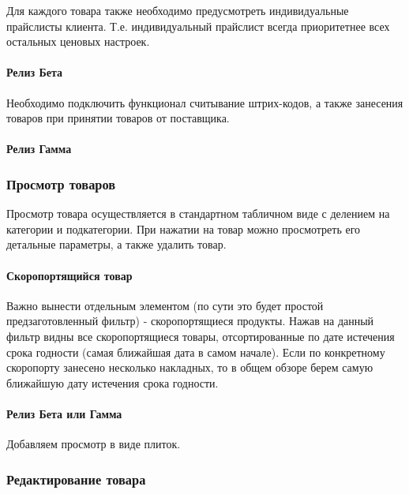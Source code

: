 \documentclass[DIV=calc, paper=a4, fontsize=11pt]{scrartcl} %
\begin{document}
Для каждого товара также необходимо предусмотреть индивидуальные прайслисты клиента. Т.е. индивидуальный прайслист всегда приоритетнее всех остальных ценовых настроек.
\paragraph{Релиз Бета}
Необходимо подключить функционал считывание штрих-кодов, а также занесения товаров при принятии товаров от поставщика.

\paragraph{Релиз Гамма}

\subsubsection{Просмотр товаров}

Просмотр товара осуществляется в стандартном табличном виде с делением на категории и подкатегории. При нажатии на товар можно просмотреть его детальные параметры, а также удалить товар. 

\paragraph{Скоропортящийся товар}
Важно вынести отдельным элементом (по сути это будет простой предзаготовленный фильтр) - скоропортящиеся продукты. Нажав на данный фильтр видны все скоропортящиеся товары, отсортированные по дате истечения срока годности (самая ближайшая дата в самом начале). Если по конкретному скоропорту занесено несколько накладных, то в общем обзоре берем самую ближайшую дату истечения срока годности.

\paragraph{Релиз Бета или Гамма}
Добавляем просмотр в виде плиток.

\subsubsection{Редактирование товара}
\end{document}
